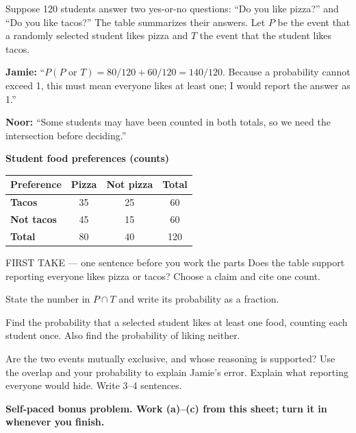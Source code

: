 \documentclass[14pt]{extarticle}
\begin{document}
\pagestyle{empty}


\noindent\begin{minipage}[t]{0.57\linewidth}
\vspace{0pt}
Suppose 120 students answer two yes-or-no questions: ``Do you like pizza?'' and ``Do you like tacos?'' The table summarizes their answers. Let $P$ be the event that a randomly selected student likes pizza and $T$ the event that the student likes tacos.\par\smallskip \textbf{Jamie:} ``$P(P\text{ or }T)=80/120+60/120=140/120$. Because a probability cannot exceed 1, this must mean everyone likes at least one; I would report the answer as 1.''\par \textbf{Noor:} ``Some students may have been counted in both totals, so we need the intersection before deciding.''\par
\end{minipage}\hfill
\begin{minipage}[t]{0.40\linewidth}
\vspace{0pt}
\begin{center}
\textbf{Student food preferences (counts)}\par\smallskip
\begin{tabular}{|l|c|c|c|}
\hline
\textbf{Preference} & \textbf{Pizza} & \textbf{Not pizza} & \textbf{Total} \\ \hline
\textbf{Tacos} & 35 & 25 & 60 \\ \hline
\textbf{Not tacos} & 45 & 15 & 60 \\ \hline
\textbf{Total} & 80 & 40 & 120 \\ \hline
\end{tabular}
\end{center}
\end{minipage}

\begin{firsttakebox}{FIRST TAKE --- one sentence before you work the parts}
Does the table support reporting everyone likes pizza or tacos? Choose a claim and cite one count.
\end{firsttakebox}

\begin{description}[leftmargin=1.15in, labelwidth=1in, itemsep=2pt, topsep=2pt]
  \item[\dokbadge{1}~(a)] State the number in $P\cap T$ and write its probability as a fraction.
  \item[\dokbadge{2}~(b)] Find the probability that a selected student likes at least one food, counting each student once. Also find the probability of liking neither.
  \item[\dokbadge{3}~(c)] Are the two events mutually exclusive, and whose reasoning is supported? Use the overlap and your probability to explain Jamie's error. Explain what reporting everyone would hide. Write 3--4 sentences.
\end{description}

\vfill
\textbf{Self-paced bonus problem. Work (a)--(c) from this sheet; turn it in whenever you finish.}
\end{document}
